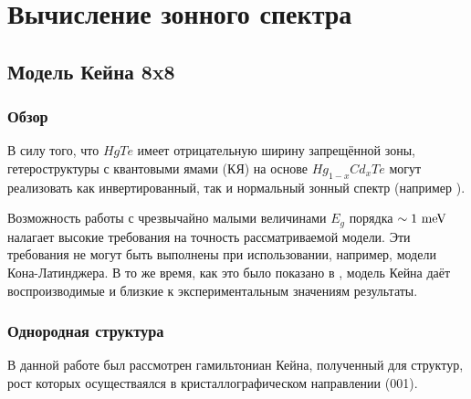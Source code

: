 \documentclass[../main.tex]{subfiles}
\begin{document}
    \chapter{Вычисление зонного спектра}

    \section{Модель Кейна 8x8}

    \subsection{Обзор}

    В силу того, что $HgTe$ имеет отрицательную ширину запрещённой зоны,
    гетероструктуры с квантовыми ямами (КЯ) на основе $Hg_{1-x}Cd_{x}Te$ 
    могут реализовать как инвертированный, так и нормальный зонный спектр
    (например \cite{MinkovValence2017}).

    Возможность работы с чрезвычайно малыми величинами $E_g$ порядка
    $\sim 1~\text{meV}$ налагает высокие требования на точность рассматриваемой 
    модели. Эти требования не могут быть выполнены при использовании,
    например, модели Кона-Латинджера. В то же время, как это было показано
    в \cite{Novik:2005}, \cite{Zholudev:Magnet:2012} модель Кейна 
    \cite{Kane:Band:1957} даёт воспроизводимые и близкие к экспериментальным 
    значениям результаты.

    \subsection{Однородная структура}

    В данной работе был рассмотрен гамильтониан Кейна, 
    полученный для структур, рост которых осуществаялся в 
    кристаллографическом направлении (001).
\end{document}
